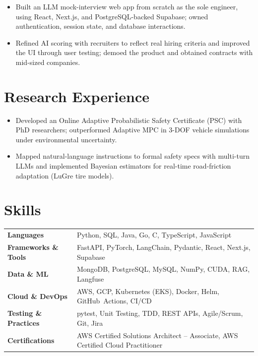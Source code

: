 \documentclass[11pt, letterpaper]{article}
\begin{document}
\vspace{1pt}
\begin{itemize}
  \item Built an LLM mock-interview web app from scratch as the sole engineer, using React, Next.js, and PostgreSQL-backed Supabase; owned authentication, session state, and database interactions.
  \item Refined AI scoring with recruiters to reflect real hiring criteria and improved the UI through user testing; demoed the product and obtained contracts with mid-sized companies.
\end{itemize}

\section{Research Experience}
\begin{itemize}
  \item Developed an Online Adaptive Probabilistic Safety Certificate (PSC) with PhD researchers; outperformed Adaptive MPC in 3-DOF vehicle simulations under environmental uncertainty.
  \item Mapped natural-language instructions to formal safety specs with multi-turn LLMs and implemented Bayesian estimators for real-time road-friction adaptation (LuGre tire models).
\end{itemize}

\section{Skills}
\begin{tabularx}{\textwidth}{@{}l @{\hspace{7pt}} >{\raggedright\arraybackslash}X@{}}
  \textbf{Languages} & Python, SQL, Java, Go, C, TypeScript, JavaScript \\[1pt]
  \textbf{Frameworks \& Tools} & FastAPI, PyTorch, LangChain, Pydantic, React, Next.js, Supabase \\[1pt]
  \textbf{Data \& ML} & MongoDB, PostgreSQL, MySQL, NumPy, CUDA, RAG, Langfuse \\[1pt]
  \textbf{Cloud \& DevOps} & AWS, GCP, Kubernetes (EKS), Docker, Helm, GitHub~Actions, CI/CD \\[1pt]
  \textbf{Testing \& Practices} & pytest, Unit Testing, TDD, REST APIs, Agile/Scrum, Git, Jira \\[1pt]
  \textbf{Certifications} & AWS Certified Solutions Architect -- Associate, AWS Certified Cloud Practitioner \\
\end{tabularx}
\end{document}
